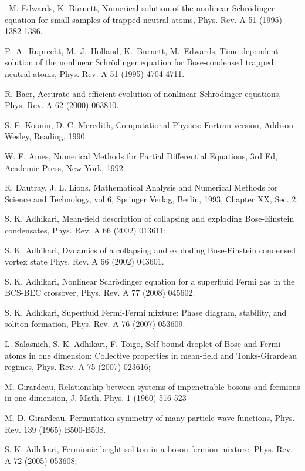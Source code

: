 \documentclass[onecolumn]{elsart3p}
\begin{document}
\begin{thebibliography}{99}
\
M. Edwards, K. Burnett, Numerical solution of the nonlinear
Schr\"{o}dinger equation for small samples of trapped neutral atoms,
Phys. Rev. A 51 (1995) 1382-1386.

P.~A.~Ruprecht, M.~J.~Holland,  K.~Burnett, M.~Edwards, Time-dependent
solution of the nonlinear {S}chr\"{o}dinger equation for
{B}ose-condensed trapped neutral atoms, Phys. Rev. A 51 (1995)
4704-4711.

R. Baer, Accurate and efficient evolution of  nonlinear
Schr\"{o}dinger equations,
Phys. Rev. A 62 (2000) 063810.


S. E. Koonin, D. C. Meredith, Computational Physics: Fortran version,
Addison-Wesley, Reading, 1990.

W. F. Ames, Numerical Methods for Partial Differential Equations, 3rd
Ed, Academic Press, New York, 1992.

R. Dautray, J. L. Lions, { Mathematical Analysis
and Numerical Methods for Science and Technology, vol 6,} Springer
Verlag, Berlin, 1993, Chapter XX, Sec. 2.

 S. K. Adhikari,
{ Mean-field description of collapsing and exploding
Bose-Einstein condensates},
Phys. Rev. A 66 (2002) 013611;

 S. K. Adhikari, { Dynamics of a collapsing and exploding Bose-Einstein condensed vortex
state}
Phys. Rev. A 66 (2002) 043601.



S. K. Adhikari, {  Nonlinear Schr\"odinger equation for
a superfluid Fermi gas in the BCS-BEC crossover},
Phys. Rev. A 77 (2008) 045602.

S. K. Adhikari, {    Superfluid Fermi-Fermi mixture:
Phase diagram, stability, and soliton formation},
Phys. Rev. A 76 (2007) 053609.

  L. Salasnich, S. K. Adhikari, F. Toigo,
{  Self-bound droplet of Bose and Fermi atoms in one
dimension: Collective properties in mean-field and Tonks-Girardeau
regimes},
Phys. Rev. A 75 (2007) 023616;

M. Girardeau, Relationship between systems of impenetrable bosons and
fermions in one dimension,
J. Math. Phys. 1 (1960) 516-523

M. D. Girardeau, Permutation symmetry of many-particle wave functions,
Phys. Rev. 139 (1965) B500-B508.




S. K. Adhikari,
{ Fermionic bright soliton in a boson-fermion mixture},
Phys. Rev. A 72 (2005)  053608;


\end{thebibliography}
\end{document}
